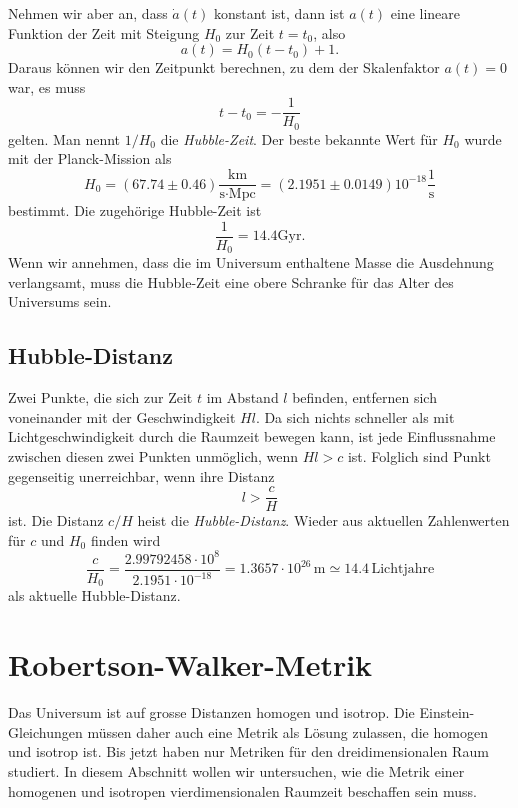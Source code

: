 Nehmen wir aber an, dass $\dot a(t)$ konstant ist, dann ist $a(t)$
eine lineare Funktion der Zeit mit Steigung  $H_0$ zur Zeit $t=t_0$,
also
\[
a(t)=H_0(t-t_0) + 1.
\]
Daraus können wir den Zeitpunkt berechnen, zu dem der Skalenfaktor
$a(t)=0$ war, es muss
\[
t-t_0 = -\frac1{H_0}
\]
gelten.
Man nennt $1/H_0$ die {\em Hubble-Zeit}.
%
Der beste bekannte Wert für $H_0$ wurde mit der Planck-Mission als
%
\begin{equation}
H_0
=
(67.74 \pm 0.46)\frac{\text{km}}{\text{s}\cdot\text{Mpc}}
=
(2.1951\pm 0.0149)
10^{-18}\frac{1}{\text{s}}
\label{skript:robertson:hubble0}
\end{equation}
bestimmt.
Die zugehörige Hubble-Zeit ist
\begin{equation}
\frac{1}{H_0} = 14.4\text{Gyr}.
\label{skript:robertson:hubblezeit}
\end{equation}
Wenn wir annehmen, dass die im Universum enthaltene Masse die Ausdehnung
verlangsamt, muss die Hubble-Zeit eine obere Schranke für das Alter
des Universums sein.

\subsection{Hubble-Distanz%
\label{skript:section:hubble-distanz}}
%
Zwei Punkte, die sich zur Zeit $t$ im Abstand $l$ befinden, entfernen
sich voneinander mit der Geschwindigkeit $Hl$. 
Da sich nichts schneller als mit Lichtgeschwindigkeit durch die
Raumzeit bewegen kann, ist jede Einflussnahme zwischen diesen zwei
Punkten unmöglich, wenn $Hl>c$ ist.
Folglich sind Punkt gegenseitig unerreichbar, wenn ihre Distanz
\begin{equation}
l > \frac{c}{H}
\label{skript:robertson:hubbledistanz}
\end{equation}
ist.
Die Distanz $c/H$ heist die {\em Hubble-Distanz}.
%
Wieder aus aktuellen Zahlenwerten für $c$ und $H_0$ finden wird
\[
\frac{c}{H_0}
=
\frac{2.99792458\cdot 10^{8}}{2.1951\cdot 10^{-18}}
=
1.3657\cdot 10^{26}\,\text{m}
\simeq
14.4\,\text{Lichtjahre}
\]
als aktuelle Hubble-Distanz.

\section{Robertson-Walker-Metrik}
Das Universum ist auf grosse Distanzen homogen und isotrop.
Die Einstein-Gleichungen müssen daher auch eine Metrik als
Lösung zulassen, die homogen und isotrop ist.
Bis jetzt haben nur Metriken für den dreidimensionalen Raum
studiert.
In diesem Abschnitt wollen wir untersuchen, wie die Metrik einer
homogenen und isotropen vierdimensionalen Raumzeit
beschaffen sein muss.

